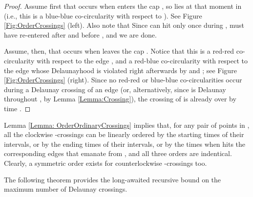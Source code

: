 \documentclass[letter,11pt]{article}
\begin{document}
{\begin{proof}
Assume first that  occurs when  enters the cap , so
 lies at that moment in  (i.e., this is a blue-blue co-circularity with respect to ).
See Figure \ref{Fig:OrderCrossings} (left). Also note that Since  can hit  only once during ,  must have re-entered  after  and before , and we are done.

Assume, then, that  occurs when  leaves the cap .
Notice that this is a red-red co-circularity with respect to the edge , and a red-blue co-circularity with respect to the edge  whose Delaunayhood is violated right afterwards by  and ; see Figure \ref{Fig:OrderCrossings} (right). Since no red-red or blue-blue co-circularities occur during a Delaunay crossing of an edge (or, alternatively, since  is Delaunay throughout , by Lemma \ref{Lemma:Crossing}), the crossing  of  is already over by time .
\end{proof}
}

Lemma \ref{Lemma: OrderOrdinaryCrossings} implies that, for any pair of points  in , all the clockwise -crossings can be linearly ordered by the starting times of their intervals, or by the ending times of their intervals, or by the times when  hits the corresponding edges that emanate from , and all three orders are indentical. Clearly, a symmetric order exists for counterlockwise -crossings too.







The following theorem provides the long-awaited recursive bound on the maximum number of Delaunay crossings.
\end{document}
